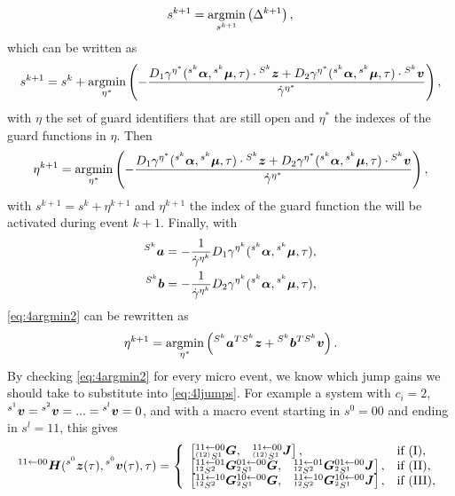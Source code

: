 \documentclass[../DC2017114Bouma.tex]{subfiles}
\begin{document}
\begin{align}
s^{k+1} = \underset{s^{k+1}}{\operatorname{\text{argmin}}}\left(\Delta^{k+1}\right),
\end{align}
which can be written as
\begin{align}
s^{k+1} = s^k + \underset{\eta^*}{\operatorname{\text{argmin}}}\left(-\frac{D_1\gamma^{\eta^*}(\hspace{0cm}^{s^k}\boldsymbol{\alpha},\hspace{0cm}^{s^k}\boldsymbol{\mu},\tau)\cdot\hspace{0cm}^{S^k}{\boldsymbol{z}} + D_2\gamma^{\eta^*}(\hspace{0cm}^{s^k}\boldsymbol{\alpha},\hspace{0cm}^{s^k}\boldsymbol{\mu},\tau)\cdot\hspace{0cm}^{S^k}{\boldsymbol{v}}}{\dot{\gamma}^{\eta^*}}\right),
\end{align}
with $\eta$ the set of guard identifiers that are still open and $\eta^*$ the indexes of the guard functions in $\eta$. Then
\begin{align}
\eta^{k+1} = \underset{\eta^*}{\operatorname{\text{argmin}}}\left(-\frac{D_1\gamma^{\eta^*}(\hspace{0cm}^{s^k}\boldsymbol{\alpha},\hspace{0cm}^{s^k}\boldsymbol{\mu},\tau)\cdot\hspace{0cm}^{S^k}{\boldsymbol{z}} + D_2\gamma^{\eta^*}(\hspace{0cm}^{s^k}\boldsymbol{\alpha},\hspace{0cm}^{s^k}\boldsymbol{\mu},\tau)\cdot\hspace{0cm}^{S^k}{\boldsymbol{v}}}{\dot{\gamma}^{\eta^*}}\right),\label{eq:4argmin2}
\end{align}
with $s^{k+1} = s^k + \eta^{k+1}$ and $\eta^{k+1}$ the index of the guard function the will be activated during event $k+1$. Finally, with
\begin{align*}
\hspace{0cm}^{S^k}{\boldsymbol{a}} &= -\frac{1}{\dot{\gamma}^{\eta^k}}D_1\gamma^{\eta^k}(\hspace{0cm}^{s^k}\boldsymbol{\alpha},\hspace{0cm}^{s^k}\boldsymbol{\mu},\tau),\\
\hspace{0cm}^{S^k}{\boldsymbol{b}} &= -\frac{1}{\dot{\gamma}^{\eta^k}}D_2\gamma^{\eta^k}(\hspace{0cm}^{s^k}\boldsymbol{\alpha},\hspace{0cm}^{s^k}\boldsymbol{\mu},\tau),
\end{align*}
\eqref{eq:4argmin2} can be rewritten as
\begin{align}
\eta^{k+1} = \underset{\eta^*}{\operatorname{\text{argmin}}}\left(\hspace{0cm}^{S^k}{\boldsymbol{a}}^T\hspace{0cm}^{S^k}{\boldsymbol{z}} +\hspace{0cm}^{S^k}{\boldsymbol{b}}^T\hspace{0cm}^{S^k}{\boldsymbol{v}}\right).
\end{align}
By checking \eqref{eq:4argmin2} for every micro event, we know which jump gains we should take to substitute into \eqref{eq:4ljumps}.
For example a system with $c_i = 2$, $\hspace{0cm}^{s^1}{\boldsymbol{v}}=\hspace{0cm}^{s^2}{\boldsymbol{v}}=...=\hspace{0cm}^{s^l}{\boldsymbol{v}}=0$, and with a macro event starting in $s^0 = 00$ and ending in $s^l = 11$, this gives 
\begin{align}
\hspace{0cm}^{11\leftarrow 00}{\boldsymbol{H}}(\hspace{0cm}^{s^0}{\boldsymbol{z}}(\tau),\hspace{0cm}^{s^0}{\boldsymbol{v}}(\tau),\tau) = \left\lbrace\begin{array}{ll}
\begin{bmatrix}\hspace{0cm}^{11\leftarrow 00}_{\hspace{0cm}^{(12)}S^1}{\boldsymbol{G}}, & \hspace{0cm}^{11\leftarrow 00}_{\hspace{0cm}^{(12)}S^1}{\boldsymbol{J}}\end{bmatrix}, & \text{if }(\text{I}),\\
\begin{bmatrix}\hspace{0cm}^{11\leftarrow 01}_{\hspace{0cm}^{12}S^2}{\boldsymbol{G}} \hspace{0cm}^{01\leftarrow 00}_{\hspace{0cm}^{2}S^1}{\boldsymbol{G}}, & \hspace{0cm}^{11\leftarrow 01}_{\hspace{0cm}^{12}S^2}{\boldsymbol{G}} \hspace{0cm}^{01\leftarrow 00}_{\hspace{0cm}^{2}S^1}{\boldsymbol{J}}\end{bmatrix}, & \text{if }(\text{II}),\\
\begin{bmatrix}\hspace{0cm}^{11\leftarrow 10}_{\hspace{0cm}^{12}S^2}{\boldsymbol{G}} \hspace{0cm}^{10\leftarrow 00}_{\hspace{0cm}^{2}S^1}{\boldsymbol{G}}, & \hspace{0cm}^{11\leftarrow 10}_{\hspace{0cm}^{12}S^2}{\boldsymbol{G}} \hspace{0cm}^{10\leftarrow 00}_{\hspace{0cm}^{2}S^1}{\boldsymbol{J}}\end{bmatrix}, & \text{if }(\text{III}),
\end{array}\right.\label{eq:4H2200}
\end{align}
\end{document}
